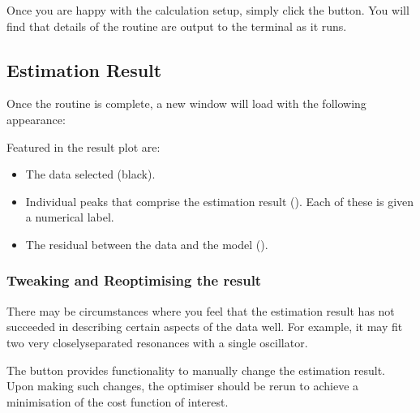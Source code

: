 \documentclass[letterpaper,10pt,english]{sphinxmanual}
\begin{document}
\sphinxAtStartPar
Once you are happy with the calculation setup, simply click the  button.
You will find that details of the routine are output to the terminal as it
runs.




\subsection{Estimation Result}
\label{\detokenize{gui/usage/result:estimation-result}}\label{\detokenize{gui/usage/result::doc}}
\sphinxAtStartPar
Once the routine is complete, a new window will load with the following
appearance:


\sphinxAtStartPar
Featured in the result plot are:
\begin{itemize}
\item {} 
\sphinxAtStartPar
The data selected (black).

\item {} 
\sphinxAtStartPar
Individual peaks that comprise the estimation result
().
Each of these is given a numerical label.

\item {} 
\sphinxAtStartPar
The residual between the data and the model ().

\end{itemize}


\subsubsection{Tweaking and Re\sphinxhyphen{}optimising the result}
\label{\detokenize{gui/usage/result:tweaking-and-re-optimising-the-result}}
\sphinxAtStartPar
There may be circumstances where you feel that the estimation result has not
succeeded in describing certain aspects of the data well. For example, it may
fit two very closely\sphinxhyphen{}separated resonances with a single oscillator.

\sphinxAtStartPar
The  button provides functionality to manually change
the estimation result. Upon making such changes, the optimiser should be re\sphinxhyphen{}run
to achieve a minimisation of the cost function of interest.
\end{document}
